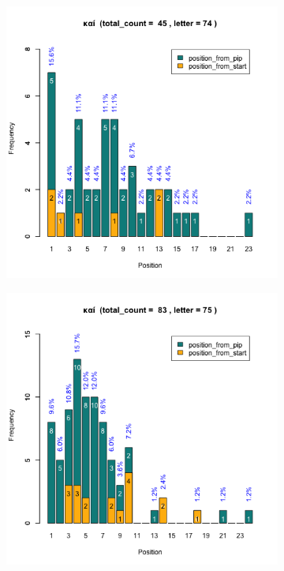 \documentclass[a4paper]{article}
\begin{document}
\begin{figure}
\begin{subfigure}{0.45\textwidth}
\end{subfigure}
\begin{subfigure}{0.45\textwidth}
\centering
\includegraphics[width=1\linewidth]{../../data/output/paul_R_par/plots/par3_lt74.png}
\end{subfigure}
\begin{subfigure}{0.45\textwidth}
\centering
\includegraphics[width=1\linewidth]{../../data/output/paul_R_par/plots/par3_lt75.png}

\end{subfigure}
\end{figure}
\end{document}
